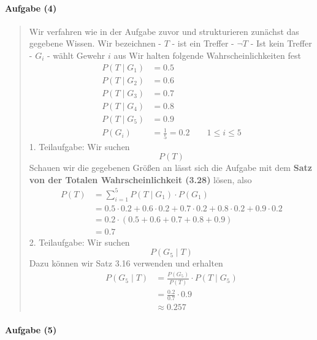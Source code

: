 \documentclass[
]{article}
\begin{document}
\paragraph{Aufgabe (4)}\label{aufgabe-4}

\begin{quote}
Wir verfahren wie in der Aufgabe zuvor und strukturieren zunächst das
gegebene Wissen. Wir bezeichnen - \(T\) - ist ein Treffer - \(\lnot T\)
- Ist kein Treffer - \(G_{i}\) - wählt Gewehr \(i\) aus Wir halten
folgende Wahrscheinlichkeiten fest \[\begin{align}
P(T\;|\;G_{1})&= 0.5 \\
P(T\;|\;G_{2})&= 0.6 \\
P(T\;|\;G_{3})&= 0.7 \\
P(T\;|\;G_{4})&= 0.8 \\
P(T\;|\;G_{5})&= 0.9 \\
P(G_{i}) &= \frac{1}{5} =0.2 \qquad 1\leq i \leq 5
\end{align}\] 1. Teilaufgabe: Wir suchen \[P(T)\] Schauen wir die
gegebenen Größen an lässt sich die Aufgabe mit dem \textbf{Satz von der
Totalen Wahrscheinlichkeit (3.28)} lösen, also \[\begin{align}
P(T) &= \sum_{i=1}^5 P(T\;|\;G_{1}) \cdot P(G_{1}) \\
 &=0.5 \cdot 0.2 + 0.6 \cdot 0.2 + 0.7 \cdot 0.2 + 0.8 \cdot 0.2 +  0.9 \cdot 0.2 \\
&= 0.2 \cdot (0.5 + 0.6 + 0.7 + 0.8 + 0.9) \\
&= 0.7
\end{align}\] 2. Teilaufgabe: Wir suchen \[P(G_{5}\;|\;T)\] Dazu können
wir Satz 3.16 verwenden und erhalten \[\begin{align}
P(G_{5}\;|\;T)&= \frac{P(G_{5})}{P(T)} \cdot P(T\;|\;G_{5})\\
&= \frac{0.2}{0.7}\cdot 0.9 \\
&\approx 0.257
\end{align}\]
\end{quote}

\paragraph{Aufgabe (5)}\label{aufgabe-5}
\end{document}
